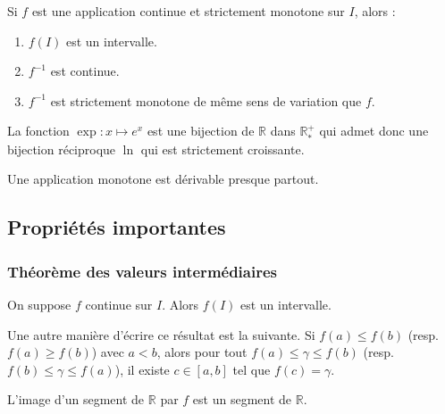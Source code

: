   \begin{theorem}
    Si $f$ est une application continue et strictement monotone sur $I$, alors :
    \begin{enumerate}[label={\bfseries(\roman*)}]
      \item $f(I)$ est un intervalle.
      \item $f^{-1}$ est continue.
      \item $f^{-1}$ est strictement monotone de même sens de variation que $f$.
    \end{enumerate}
  \end{theorem}

  \begin{example}
    La fonction $\exp : x \mapsto e^x$ est une bijection de $\mathbb{R}$ dans $\mathbb{R}^{+}_{*}$ qui admet donc une bijection réciproque $\ln$ qui est strictement croissante.
  \end{example}


  \begin{theorem}
    Une application monotone est dérivable presque partout.
  \end{theorem}

  \subsection{Propriétés importantes}

  \subsubsection{Théorème des valeurs intermédiaires}


  \begin{theorem}
    On suppose $f$ continue sur $I$. Alors $f(I)$ est un intervalle.
  \end{theorem}

  \begin{remark}
    Une autre manière d'écrire ce résultat est la suivante. Si $f(a) \leq f(b)$ (resp. $f(a) \geq f(b)$) avec $a < b$, alors pour tout $f(a) \leq \gamma \leq f(b)$ (resp. $f(b) \leq \gamma \leq f(a)$), il existe $c \in [a,b]$ tel que $f(c) = \gamma$.
  \end{remark}

  \begin{corollary}
    L'image d'un segment de $\mathbb{R}$ par $f$ est un segment de $\mathbb{R}$.
  \end{corollary}

